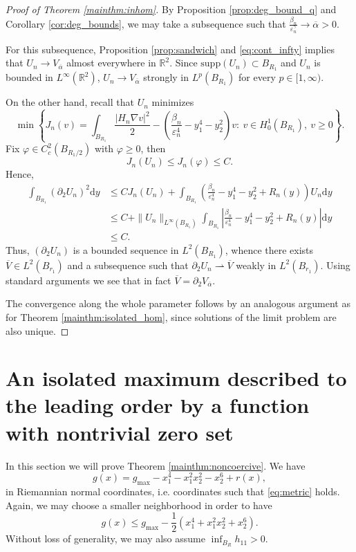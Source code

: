 \documentclass[10pt,a4paper]{article}
\newcommand{\gmax}{g_{\mathrm{max}}}
\newcommand{\RR}{\mathbb{R}}
\newcommand{\supp}{\mathrm{supp}}
\numberwithin{equation}{section}
\begin{document}
\begin{proof}[Proof of Theorem \ref{mainthm:inhom}]
	By Proposition \ref{prop:deg_bound_q} and Corollary \ref{cor:deg_bounds}, we may take a subsequence such that $\frac{\beta_n}{\varepsilon_n^{\gamma}} \rightarrow \overline{\alpha} > 0$.

	For this subsequence, Proposition \ref{prop:sandwich} and \eqref{eq:cont_infty} implies that $ U_n \rightarrow V_{\overline{\alpha}} $ almost everywhere in $ \RR^{2} $. Since $ \supp(U_n) \subset B_{R_1} $ and $ U_n $ is bounded in $ L^{\infty}(\RR^{2}) $, $U_n \rightarrow V_{\overline{\alpha}}$ strongly in $ L^{p}(B_{R_1}) $ for every $ p\in [1,\infty) $.
	
	On the other hand, recall that $ U_n $ minimizes
	\[\min \left\{ J_n(v) = \int_{B_{R_1}} \frac{|H_n \nabla v|^{2}}{2}  - \left( \frac{\beta_n}{\varepsilon_n^{4}} - y_1^{4} - y_2^{2} \right) v :~ v\in H^{1}_0(B_{R_1}),~ v\geq 0  \right\}. \]
	Fix $ \varphi \in C^{2}_c(B_{R_1 / 2}) $ with $ \varphi \geq 0 $, then
	\[J_n(U_n) \leq J_n(\varphi) \leq C.\]
	Hence,
	\begin{align*}
		\int_{B_{R_1}} (\partial_2 U_{n})^2 \mathrm{d}y &\leq CJ_n(U_n) + \int_{B_{R_1}} \left( \frac{\beta_n}{\varepsilon_n^{4}} - y_1^{4} - y_2^{2} + R_n(y) \right) U_n \mathrm{d}y  \\ 
								&\leq C + \|U_n\|_{L^{\infty}(B_{R_1})} \int_{B_{R_1}}\left| \frac{\beta_n}{\varepsilon_n^{4}} - y_1^{4} - y_2^{2} + R_n(y) \right| \mathrm{d}y \\
								&\leq C.
	\end{align*}
	Thus, $ (\partial_2 U_n) $ is a bounded sequence in $ L^{2}(B_{R_1}) $, whence there exists $ \overline{V} \in L^{2}(B_{r_1}) $ and a subsequence such that $\partial_2 U_n \rightharpoonup \overline{V}$ weakly in $ L^{2}(B_{r_1}) $. Using standard arguments we see that in fact $ \overline{V} = \partial_2 V_{\overline{\alpha}} $.

	The convergence along the whole parameter follows by an analogous argument as for Theorem \ref{mainthm:isolated_hom}, since solutions of the limit problem are also unique.
\end{proof}

\section{An isolated maximum described to the leading order by a function with nontrivial zero set}
\label{sect:noncoercive}

In this section we will prove Theorem \ref{mainthm:noncoercive}. We have
\[
	g(x) = \gmax - x_1^{4} - x_1^{2} x_2^{2} - x_2^{6} + r(x),
\]
in Riemannian normal coordinates, i.e. coordinates such that \eqref{eq:metric} holds. Again, we may choose a smaller neighborhood in order to have
\[
	g(x) \leq \gmax - \frac{1}{2} \left( x_1^{4} + x_1^{2} x_2^{2} + x_2^{6} \right). 
\]
Without loss of generality, we may also assume $ \inf_{B_R} h_{11} > 0 $.
\end{document}
